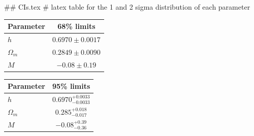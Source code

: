 ## CIs.tex
# latex table for the 1 and 2 sigma distribution of each parameter

\begin{tabular} { l  c}
 Parameter &  68\% limits\\
\hline
{\boldmath$h              $} & $0.6970\pm 0.0017          $\\
{\boldmath$\Omega_m       $} & $0.2849\pm 0.0090          $\\
{\boldmath$M              $} & $-0.08\pm 0.19             $\\
\hline
\end{tabular}

\begin{tabular} { l  c}
 Parameter &  95\% limits\\
\hline
{\boldmath$h              $} & $0.6970^{+0.0033}_{-0.0033}$\\
{\boldmath$\Omega_m       $} & $0.285^{+0.018}_{-0.017}   $\\
{\boldmath$M              $} & $-0.08^{+0.39}_{-0.36}     $\\
\hline
\end{tabular}
